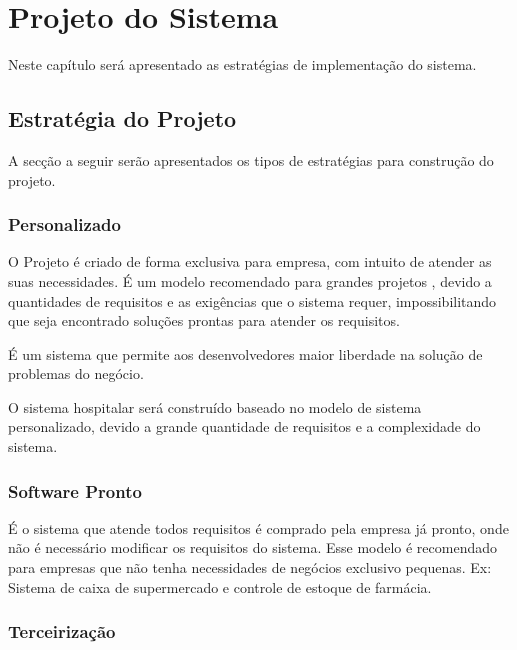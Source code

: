 
\chapter{Projeto do Sistema}
 Neste capítulo será apresentado as estratégias de implementação  do sistema.

\section{Estrat\'{e}gia do Projeto}

A secção a seguir serão apresentados os tipos de estratégias para construção do projeto.

    \subsection{Personalizado}
    O Projeto é criado de forma exclusiva para empresa, com intuito de atender as suas necessidades. É um modelo recomendado para grandes projetos , devido a quantidades de requisitos e as exigências que o sistema requer, impossibilitando que seja encontrado soluções prontas para atender os requisitos.

 É um sistema que permite aos desenvolvedores maior liberdade na solução de problemas do negócio.

O sistema hospitalar será construído baseado no modelo de sistema personalizado, devido a grande quantidade de requisitos e a complexidade do sistema.



    \subsection{Software Pronto}
    É o sistema que atende todos requisitos é comprado pela empresa já pronto,  onde não é necessário modificar os requisitos do sistema. Esse modelo é recomendado para empresas que não tenha necessidades de negócios exclusivo pequenas.  Ex: Sistema de caixa de supermercado e controle de estoque de farmácia.

    \subsection{Terceirização}
    
